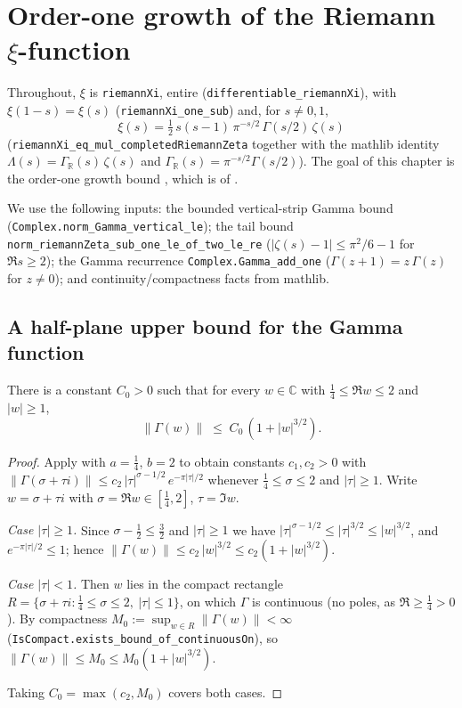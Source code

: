 
\chapter{Order-one growth of the Riemann \texorpdfstring{$\xi$}{xi}-function}
\label{cha:xi_order}

Throughout, $\xi$ is \texttt{riemannXi}, entire
(\texttt{differentiable\_riemannXi}), with $\xi(1-s)=\xi(s)$
(\texttt{riemannXi\_one\_sub}) and, for $s\neq0,1$,
\[
  \xi(s)=\tfrac12\,s(s-1)\,\pi^{-s/2}\,\Gamma(s/2)\,\zeta(s)
\]
(\texttt{riemannXi\_eq\_mul\_completedRiemannZeta} together with the mathlib identity
$\Lambda(s)=\Gamma_{\mathbb R}(s)\,\zeta(s)$ and
$\Gamma_{\mathbb R}(s)=\pi^{-s/2}\Gamma(s/2)$). The goal of this chapter is the
order-one growth bound , which is  of
.

We use the following inputs: the bounded vertical-strip Gamma bound
 (\texttt{Complex.norm\_Gamma\_vertical\_le}); the
tail bound \texttt{norm\_riemannZeta\_sub\_one\_le\_of\_two\_le\_re}
($|\zeta(s)-1|\le\pi^2/6-1$ for $\Re s\ge2$); the Gamma recurrence
\texttt{Complex.Gamma\_add\_one} ($\Gamma(z+1)=z\,\Gamma(z)$ for $z\neq0$); and
continuity/compactness facts from mathlib.

\section{A half-plane upper bound for the Gamma function}
\label{sec:xo_gamma}

\begin{lemma}
\label{lem:xo_gamma_strip_bounded}
\leanok
{}
There is a constant $C_0>0$ such that for every $w\in\mathbb C$ with
$\tfrac14\le\Re w\le2$ and $|w|\ge1$,
\[
  \|\Gamma(w)\|\;\le\;C_0\,(1+|w|^{3/2}).
\]
\end{lemma}

\begin{proof}
\leanok
{}
Apply  with $a=\tfrac14$, $b=2$ to obtain constants
$c_1,c_2>0$ with
$\|\Gamma(\sigma+\tau i)\|\le c_2\,|\tau|^{\sigma-1/2}\,e^{-\pi|\tau|/2}$ whenever
$\tfrac14\le\sigma\le2$ and $|\tau|\ge1$. Write $w=\sigma+\tau i$ with
$\sigma=\Re w\in[\tfrac14,2]$, $\tau=\Im w$.

\emph{Case $|\tau|\ge1$.} Since $\sigma-\tfrac12\le\tfrac32$ and $|\tau|\ge1$ we have
$|\tau|^{\sigma-1/2}\le|\tau|^{3/2}\le|w|^{3/2}$, and $e^{-\pi|\tau|/2}\le1$; hence
$\|\Gamma(w)\|\le c_2\,|w|^{3/2}\le c_2(1+|w|^{3/2})$.

\emph{Case $|\tau|<1$.} Then $w$ lies in the compact rectangle
$R=\{\sigma+\tau i:\tfrac14\le\sigma\le2,\ |\tau|\le1\}$, on which $\Gamma$ is
continuous (no poles, as $\Re\ge\tfrac14>0$). By compactness
$M_0:=\sup_{w\in R}\|\Gamma(w)\|<\infty$
(\texttt{IsCompact.exists\_bound\_of\_continuousOn}), so
$\|\Gamma(w)\|\le M_0\le M_0(1+|w|^{3/2})$.

Taking $C_0=\max(c_2,M_0)$ covers both cases.
\end{proof}

